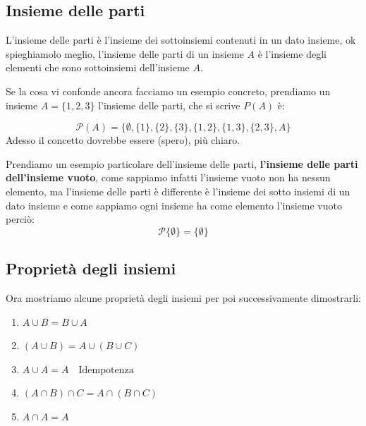 \documentclass{article}
\begin{document}
\subsection{Insieme delle parti}
L'insieme delle parti è l'insieme dei sottoinsiemi contenuti in un dato insieme, ok spieghiamolo meglio, l'insieme delle parti di un insieme $A$ è l'insieme degli elementi che sono sottoinsiemi dell'insieme $A$. \par
Se la cosa vi confonde ancora facciamo un esempio concreto, prendiamo un insieme $A = \{1,2,3\}$ l'insieme delle parti, che si scrive $P(A)$ è:

\begin{equation}
        \mathcal{P}(A) = \{\emptyset, \{1\}, \{2\}, \{3\}, \{1, 2\}, \{1, 3\}, \{2, 3\}, A \}
\end{equation}
Adesso il concetto dovrebbe essere (spero), più chiaro. \newline 

Prendiamo un esempio particolare dell'insieme delle parti, \textbf{l'insieme delle parti dell'insieme vuoto}, come sappiamo infatti l'insieme vuoto non ha nessun elemento, ma l'insieme delle parti è differente è l'insieme dei sotto insiemi di un dato insieme e come sappiamo ogni insieme ha come elemento l'insieme vuoto perciò:
\begin{equation}
        \mathcal{P}\{\emptyset\} = \{\emptyset  \}
\end{equation}



\subsection{Proprietà degli insiemi}
Ora mostriamo alcune proprietà degli insiemi per poi successivamente dimostrarli:
\begin{enumerate}
        \item $A \cup B = B \cup A$\label{itm:prop1}	
        \item $(A \cup B) = A \cup (B \cup C)$\label{itm:prop_associativa1}
        \item $A \cup A = A \quad \mbox{Idempotenza}$\label{itm:prop3}
        \item $(A \cap B) \cap C = A \cap (B \cap C)$\label{itm:prop_associativa2} 
        \item $A \cap A = A$\label{itm:prop5}
\end{enumerate}
\end{document}

